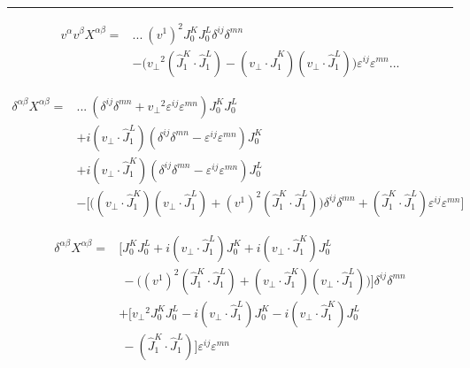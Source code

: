 \documentclass[12pt]{article}
\begin{document}
\hrule

\begin{equation*}
\begin{split}
v^\alpha v^\beta X^{\alpha \beta} = & ...~ (v^1)^2 J_0 ^K J_0^L \delta^{ij} \delta^{mn} \\
& - \Big( {v_\perp}^2 (\hat{J}_1^K \cdot \hat{J}_1^L) - (v_\perp \cdot \hat{J}_1^K)(v_\perp \cdot \hat{J}_1^L)\Big)  \varepsilon^{ij} \varepsilon^{mn} ...
\end{split}
\end{equation*}

\begin{equation*}
\begin{split}
\delta^{\alpha \beta} X^{\alpha \beta}=& ...~ (\delta^{ij} \delta^{mn} + {v_\perp}^2 \varepsilon^{ij} \varepsilon^{mn}) J_0 ^K J_0^L \\
& + i (v_\perp \cdot \hat{J}_1^L) (\delta^{ij} \delta^{mn} - \varepsilon^{ij} \varepsilon^{mn}) J_0 ^K  \\
& + i (v_\perp \cdot \hat{J}_1^K) (\delta^{ij} \delta^{mn} - \varepsilon^{ij} \varepsilon^{mn}) J_0^L \\
& - \bigg[ \Big((v_\perp \cdot \hat{J}_1^K) (v_\perp \cdot \hat{J}_1^L) + (v^1)^2 (\hat{J}_1^K \cdot \hat{J}_1^L) \Big) \delta^{ij} \delta^{mn} + (\hat{J}_1^K \cdot \hat{J}_1^L) \varepsilon^{ij}\varepsilon^{mn} \bigg] \end{split}
\end{equation*}

\begin{equation*}
\begin{split}
\delta^{\alpha \beta} X^{\alpha \beta} = & \Big[ J_0^K J_0^L + i(v_\perp \cdot \hat{J}_1^L) J_0^K + i(v_\perp \cdot \hat{J}_1^K)  J_0^L\\
& ~ -\Big((v^1)^2 (\hat{J}_1^K \cdot \hat{J}_1^L)+(v_\perp \cdot \hat{J}_1^K) (v_\perp \cdot \hat{J}_1^L) \Big) \Big] \delta^{ij} \delta^{mn}\\
& + \Big[ {v_\perp}^2 J_0^KJ_0^L - i (v_\perp \cdot \hat{J}_1^L) J_0^K - i (v_\perp \cdot \hat{J}_1^K) J_0^L\\
& ~ - (\hat{J}_1^K \cdot \hat{J}_1^L) \Big] \varepsilon^{ij} \varepsilon^{mn}
\end{split}
\end{equation*}
\end{document}
